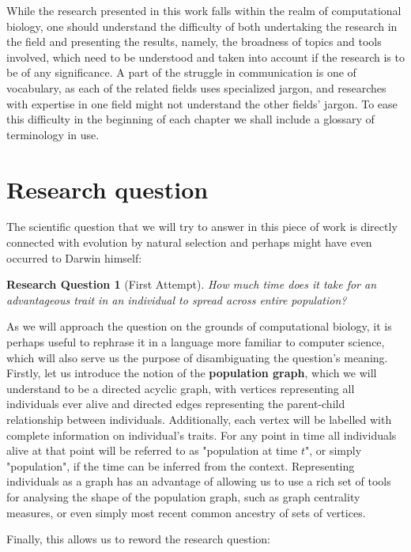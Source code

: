 \documentclass{l4proj}
\newtheorem*{quest}{Research Question}
\newif\ifdebug
\begin{document}
\ifdebug
  Next paragraph does not have to be included in the final version of the dissertation.
\fi

While the research presented in this work falls within the realm of computational biology, one should understand the difficulty of both undertaking the research in the field and presenting the results, namely, the broadness of topics and tools involved, which need to be understood and taken into account if the research is to be of any significance. A part of the struggle in communication is one of vocabulary, as each of the related fields uses specialized jargon, and researches with expertise in one field might not understand the other fields' jargon. To ease this difficulty in the beginning of each chapter we shall include a glossary of terminology in use.

\section{Research question}
The scientific question that we will try to answer in this piece of work is directly connected with evolution by natural selection and perhaps might have even occurred to Darwin himself:

\begin{quest}[First Attempt]
How much time does it take for an advantageous trait in an individual to spread across entire population?
\end{quest}

As we will approach the question on the grounds of computational biology, it is perhaps useful to rephrase it in a language more familiar to computer science, which will also serve us the purpose of disambiguating the question's meaning. Firstly, let us introduce the notion of the \textbf{population graph}, which we will understand to be a directed acyclic graph, with vertices representing all individuals ever alive and directed edges representing the parent-child relationship between individuals. Additionally, each vertex will be labelled with complete information on individual's traits. For any point in time all individuals alive at that point will be referred to as "population at time $t$", or simply "population", if the time can be inferred from the context. Representing individuals as a graph has an advantage of allowing us to use a rich set of tools for analysing the shape of the population graph, such as graph centrality measures, or even simply most recent common ancestry of sets of vertices.

Finally, this allows us to reword the research question:
\end{document}
